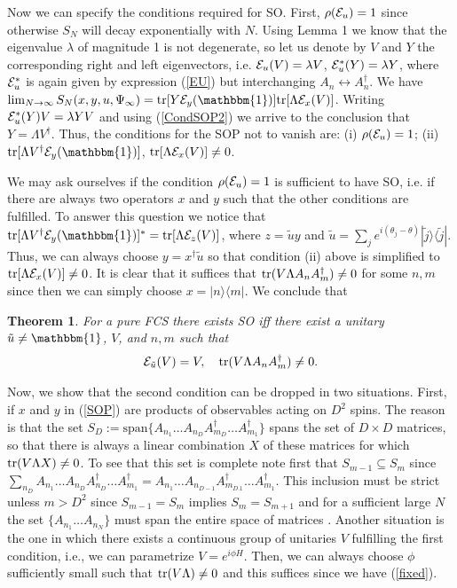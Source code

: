 \documentclass[prl,floatfix,showpacs,amsmat,twocolumn]{revtex4}
\newtheorem{theorem}{Theorem}
\newcommand{\be}{\begin{eqnarray}}
\newcommand{\ee}{\end{eqnarray}}
\newcommand{\1}{\mathbbm{1}}
\renewcommand{\>}{\rangle}
\newcommand{\<}{\langle}
\newcommand{\vs}{\vspace*{4pt}}
\begin{document}
Now we can specify the conditions required for SO. First,
$\rho({\cal E}_u)=1$ since otherwise $S_N$ will decay
exponentially with $N$. Using Lemma 1 we know that the eigenvalue
$\lambda$ of magnitude 1 is not degenerate, so let us denote by
$V$ and $Y$ the corresponding right and left eigenvectors, i.e.
${\cal E}_u(V)=\lambda V$, ${\cal E}^*_u(Y)=\lambda Y$, where
${\cal E}^*_u$ is again given by expression (\ref{EU}) but
interchanging $A_n\leftrightarrow A_n^\dagger$. We have
$\lim_{N\to\infty}S_N(x,y,u,\Psi_\infty) = {\rm tr}[Y {\cal
            E}_y(\1)] {\rm tr}[\Lambda {\cal E}_x(V)]$. Writing ${\cal
            E}_u^*(Y)V=\lambda YV$ and using (\ref{CondSOP2}) we arrive to the
conclusion that $Y=\Lambda V^\dagger$. Thus, the conditions for
the SOP not to vanish are: (i) $\rho({\cal E}_u)=1$; (ii) ${\rm
            tr}[\Lambda V^\dagger {\cal E}_y(\1)]$, ${\rm tr}[\Lambda {\cal
                E}_x(V)]\ne 0$.

We may ask ourselves if the condition $\rho({\cal E}_u)=1$ is
sufficient to have SO, i.e. if there are always two operators $x$
and $y$ such that the other conditions are fulfilled. To answer
this question we notice that ${\rm tr}[\Lambda V^\dagger {\cal
                E}_y(\1)]^\ast={\rm tr}[\Lambda {\cal E}_z(V)]$, where $z=\tilde u
    y$ and $\tilde u=\sum_j e^{i(\theta_j-\theta)}|\tilde
    j\rangle\langle \tilde j|$. Thus, we can always choose
$y=x^\dagger \tilde u$ so that condition (ii) above is simplified
to ${\rm tr}[\Lambda {\cal E}_x(V)]\ne 0$. It is clear that it
suffices that ${\rm tr}(V\Lambda A_n A_m^\dagger)\ne 0$ for some
$n,m$ since then we can simply choose $x=|n\rangle\langle m|$. We
conclude that

\begin{theorem} For a pure FCS there exists SO iff there exist a
    unitary $\tilde u\ne \1$, $V$, and $n,m$ such that
    \be
        \label{Th1}
        {\cal E}_{\tilde u}(V)=V,\quad {\rm tr}(V\Lambda A_n A_m^\dagger)\ne 0.
    \ee
\end{theorem}

Now, we show that the second condition can be dropped in two
situations. First, if $x$ and $y$ in (\ref{SOP}) are products of
observables acting on $D^2$ spins. The reason is that the set
$S_D:=\text{span}\{A_{n_1}\ldots A_{n_D} A_{m_D}^\dagger\ldots
    A_{m_1}^\dagger\}$ spans the set of $D\times D$ matrices, so that
there is always a linear combination $X$ of these matrices for
which ${\rm tr}(V\Lambda X)\ne 0$. To see that this set is
complete note first that $S_{m-1}\subseteq S_m$ since
$\sum_{n_D}A_{n_1}\ldots A_{n_D} A_{n_D}^\dagger\ldots
    A_{m_1}^\dagger=A_{n_1}\ldots A_{n_{D-1}}
    A_{m_{D.1}}^\dagger\ldots A_{m_1}^\dagger$. This inclusion must be
strict unless $m> D^2$ since $S_{m-1}=S_m$ implies $S_m=S_{m+1}$
and for a sufficient large $N$ the set $\{A_{n_1}\ldots A_{n_N}\}$
must span the entire space of matrices \cite{MPS-mother}. Another
situation is the one in which there exists a continuous group of
unitaries $V$ fulfilling the first condition, i.e., we can
parametrize $V=e^{i\phi H}$. Then, we can always choose $\phi$
sufficiently small such that ${\rm tr}(V\Lambda)\ne 0$ and this
suffices since we have (\ref{fixed}). \vs
\end{document}
